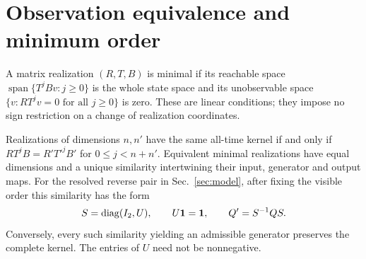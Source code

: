 \section{Observation equivalence and minimum order}\label{app:realization}
A matrix realization $(R,T,B)$ is minimal if its reachable space
$\operatorname{span}\{T^jBv:j\ge0\}$ is the whole state space and its
unobservable space $\{v:RT^jv=0\text{ for all }j\ge0\}$ is zero.
These are linear conditions; they impose no sign restriction on a change
of realization coordinates.

\begin{lemma}\label{lem:orbit}
Realizations of dimensions $n,n'$ have the same all-time kernel if and only
if $RT^jB=R'T'^jB'$ for $0\le j<n+n'$. Equivalent minimal realizations have
equal dimensions and a unique similarity intertwining their input,
generator and output maps. For the resolved reverse pair in
Sec.~\ref{sec:model}, after fixing the visible order this similarity has
the form
\begin{equation}
 S=\operatorname{diag}(I_2,U),\qquad U\mathbf 1=\mathbf 1,\qquad Q'=S^{-1}QS.\label{eq:orbit}
\end{equation}
Conversely, every such similarity yielding an admissible generator
preserves the complete kernel. The entries of $U$ need not be nonnegative.
\end{lemma}
